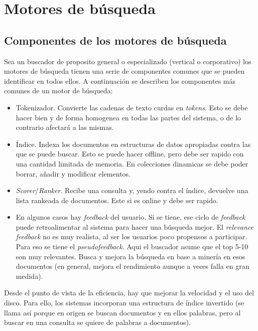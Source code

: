 \chapter{Motores de búsqueda}\label{Chapter5} 

\section{Componentes de los motores de búsqueda}

Sea un buscador de proposito general o especializado (vertical o corporativo) los motores de búsqueda tienen una serie de componentes comunes que se pueden identificar en todos ellos. A continuación se describen los componentes más comunes de un motor de búsqueda:
\begin{itemize}
\item Tokenizador. Convierte las cadenas de texto curdas en \textit{tokens}. Esto se debe hacer bien y de forma homogenea en todas las partes del sistema, o de lo contrario afectará a las mismas.
\item Índice. Indexa los documentos en estructuras de datos apropiadas contra las que se puede buscar. Esto se puede hacer offline, pero debe ser rapido con una cantidad limitada de memoria. En colecciones dinamicas se debe poder borrar, añadir y modificar elementos.
\item \textit{Scorer}/\textit{Ranker}. Recibe una consulta y, yendo contra el índice, devuelve una lista rankeada de documentos. Este si es online y debe ser rapido. 
\item En algunos casos hay \textit{feedback} del usuario. Si se tiene, ese ciclo de \textit{feedback} puede retroalimentar al sistema para hacer una búsqueda mejor.  El \textit{relevance feedback} no es muy realista, al ser los usuarios poco propensos a participar. Para eso se tiene el \textit{pseudofeedback}. Aqui el buscador asume que el top 5-10 son muy relevantes. Busca y mejora la búsqueda en base a minería en esos documentos (en general, mejora el rendimiento aunque a  veces falla en gran medida). 
\end{itemize}

Desde el punto de vista de la eficiencia, hay que mejorar la velocidad y el uso del disco. Para ello, los sistemas incorporan una estructura de índice invertido (se llama así porque en origen se buscan documentos y en ellos palabras, pero al buscar en una consulta se quiere de palabras a documentos). 


